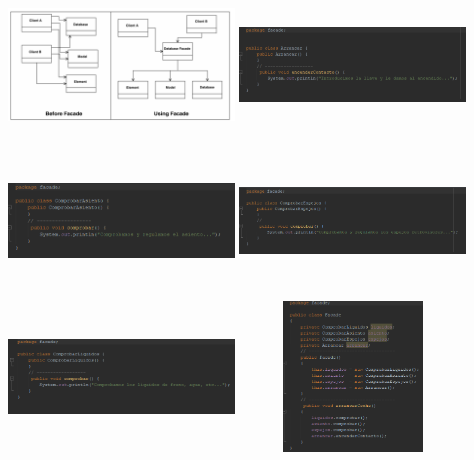 \documentclass[twoside,twocolumn]{article}
\begin{document}
\begin{itemize}
\includegraphics[width=6cm, height=4cm]{imagenes/facade.png}
\includegraphics[width=6cm, height=4cm]{imagenes/faca1.png}
\includegraphics[width=6cm, height=4cm]{imagenes/faca2.png}
\includegraphics[width=6cm, height=4cm]{imagenes/faca3.png}
\includegraphics[width=6cm, height=4cm]{imagenes/faca4.png}
\includegraphics[width=6cm, height=4cm]{imagenes/faca5.png}

\end{itemize}
\end{document}
